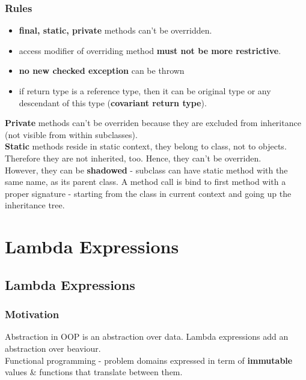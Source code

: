 \documentclass{report}
\begin{document}
\section*{Rules}
\begin{itemize}
	\item \textbf{final, static, private} methods can't be overridden.
	\item access modifier of overriding method \textbf{must not be more restrictive}.
	\item \textbf{no new checked exception} can be thrown
	\item if return type is a reference type, then it can be original type or any descendant of this type (\textbf{covariant return type}).
\end{itemize}

\textbf{Private} methods can't be overriden because they are excluded from inheritance (not visible from within subclasses). \\
\textbf{Static} methods reside in static context, they belong to class, not to objects. Therefore they are not inherited, too. Hence, they can't be overriden. \\
However, they can be \textbf{shadowed} - subclass can have static method with the same name, as its parent class. A method call is bind to first method with a proper signature - starting 
from the class in current context and going up the inheritance tree.




\part{Lambda Expressions}
\chapter{Lambda Expressions}
\section{Motivation}
Abstraction in OOP is an abstraction over data. Lambda expressions add an abstraction over beaviour.\\
Functional programming - problem domains expressed in term of \textbf{immutable} values \& functions that translate between them. 
\end{document}
